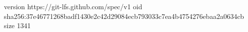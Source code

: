 version https://git-lfs.github.com/spec/v1
oid sha256:37e46771268badf1430e2c42d29084ecb793033c7ea4b4754276ebaa2a0634cb
size 1341
